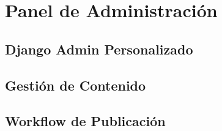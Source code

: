 \chapter{Panel de Administración}
\section{Django Admin Personalizado}
\section{Gestión de Contenido}
\section{Workflow de Publicación}

